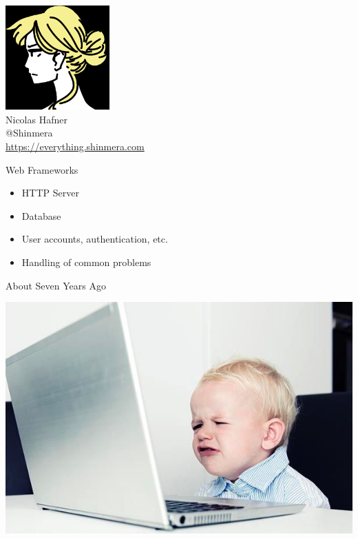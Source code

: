 \documentclass[14pt]{beamer}
\renewcommand{\title}[1]{
  {\huge #1} \vskip 0.4cm
}
\begin{document}
\begin{frame}
  \begin{center}
    \includegraphics[height=4cm]{avatar.png}\\
    \vspace{0.2cm}
    {\Large Nicolas Hafner} \\
    \vspace{0.2cm}
    {\LARGE @Shinmera} \\
    \vspace{0.2cm}
    \url{https://everything.shinmera.com}
  \end{center}
\end{frame}

\begin{frame}
  \title{Web Frameworks}
  \begin{itemize}
  \item HTTP Server
  \item Database
  \item User accounts, authentication, etc.
  \item Handling of common problems
  \end{itemize}
\end{frame}

\begin{frame}
  \title{About Seven Years Ago}
  \begin{center}
    \includegraphics[width=0.8\columnwidth]{baby-at-computer.jpg}
  \end{center}
\end{frame}
\end{document}
